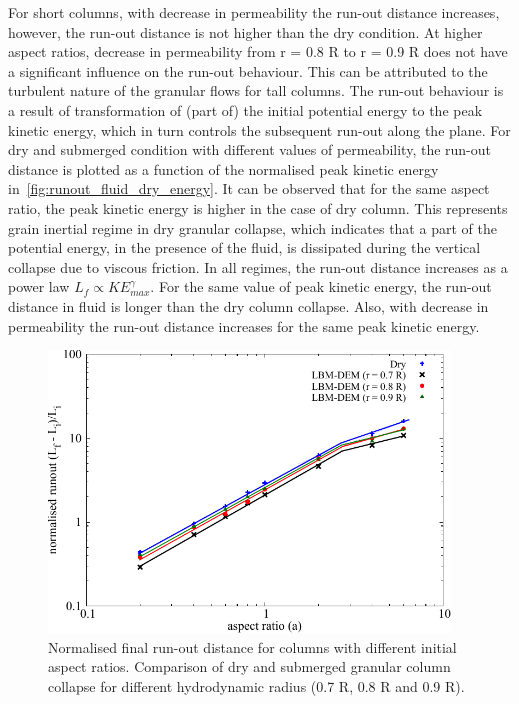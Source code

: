 For short columns, with decrease in permeability the run-out distance 
increases, however, the run-out distance is not higher than the dry condition. 
At higher aspect ratios, decrease in permeability from r = 0.8 R to r = 0.9 R 
does not have a significant influence on the run-out behaviour. This can be 
attributed to the turbulent nature of the granular flows for tall 
columns. The run-out behaviour is a result of transformation of (part of) the 
initial potential energy to the peak kinetic energy, which in turn controls the 
subsequent run-out along the plane. For dry and submerged condition with 
different values of permeability, the run-out distance is plotted as a 
function of the normalised peak kinetic energy 
in~\cref{fig:runout_fluid_dry_energy}. It can be observed that for the same 
aspect ratio, the peak kinetic energy is higher in the case of dry column. This 
represents grain inertial regime in dry granular collapse, which indicates that 
a part of the potential energy, in the presence of the fluid, is dissipated 
during the vertical collapse due to viscous friction. In all regimes, the 
run-out distance increases as a power law $L_f \propto KE_{max}^\gamma$. For 
the same value of peak kinetic energy, the run-out distance in fluid is longer 
than the dry column collapse. Also, with decrease in 
permeability the run-out distance increases for the same peak kinetic energy. 
\begin{figure}[tbhp]
	\centering
	\includegraphics[width=0.95\textwidth]{runout_fluid_dry}
	\caption{Normalised final run-out distance for columns with different 
	initial aspect ratios. Comparison of dry and submerged granular column 
	collapse for different hydrodynamic radius (0.7 R, 0.8 R and 0.9 R).}
	\label{fig:runout_fluid_dry}
\end{figure} 

